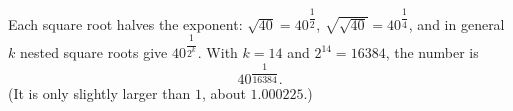 Each square root halves the exponent: $\sqrt{40}=40^{\dfrac{1}{2}}$, $\sqrt{\sqrt{40}}=40^{\dfrac{1}{4}}$, and in general $k$ nested square roots give $40^{\dfrac{1}{2^k}}$. With $k=14$ and $2^{14}=16384$, the number is
\[\boxed{40^{\dfrac{1}{16384}}}.\]
(It is only slightly larger than $1$, about $1.000225$.)
